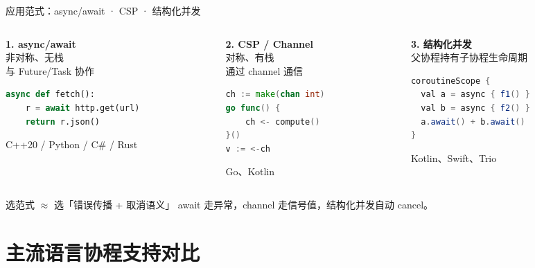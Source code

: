 \documentclass[aspectratio=169, 10pt]{beamer}
\begin{document}
\begin{frame}[fragile]{应用范式：async/await · CSP · 结构化并发}
  \begin{columns}[T]
    \begin{column}{0.32\textwidth}
      \textcolor{blue!70}{\textbf{1. async/await}}\\[0.15cm]
      非对称、无栈\\与 Future/Task 协作
      \begin{lstlisting}[language=Python, basicstyle=\ttfamily\tiny]
async def fetch():
    r = await http.get(url)
    return r.json()
      \end{lstlisting}
      {\tiny C++20 / Python / C\# / Rust}
    \end{column}
    \begin{column}{0.32\textwidth}
      \textcolor{orange!80!black}{\textbf{2. CSP / Channel}}\\[0.15cm]
      对称、有栈\\通过 channel 通信
      \begin{lstlisting}[language=Go, basicstyle=\ttfamily\tiny]
ch := make(chan int)
go func() {
    ch <- compute()
}()
v := <-ch
      \end{lstlisting}
      {\tiny Go、Kotlin}
    \end{column}
    \begin{column}{0.32\textwidth}
      \textcolor{green!50!black}{\textbf{3. 结构化并发}}\\[0.15cm]
      父协程持有子协程生命周期
      \begin{lstlisting}[language=Java, basicstyle=\ttfamily\tiny]
coroutineScope {
  val a = async { f1() }
  val b = async { f2() }
  a.await() + b.await()
}
      \end{lstlisting}
      {\tiny Kotlin、Swift、Trio}
    \end{column}
  \end{columns}

  \vspace{0.4cm}
  \begin{block}{选范式 $\approx$ 选「错误传播 + 取消语义」}
    await 走异常，channel 走信号值，结构化并发自动 cancel。
  \end{block}
\end{frame}

\section{主流语言协程支持对比}
\end{document}
